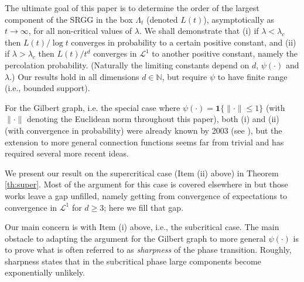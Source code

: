 \documentclass[a4paper,12pt]{scrartcl}
\newcommand{\conn}{\psi}
\theoremstyle{definition}
\theoremstyle{remark}
\begin{document}

The ultimate goal of this paper is to determine the %
order of the largest component of the SRGG in the box $\Lambda_t$
(denoted $L(t)$), asymptotically as $t \to \infty$, for all non-critical values of $\lambda$. We shall demonstrate
that (i) if $\lambda < \lambda_c$ then $L(t)/ \log t$ converges in probability
to a certain positive constant, and (ii)
if $\lambda > \lambda_c$ then $L(t)/  t^d$ converges in $\mathcal L^1$
to another  positive constant,  namely the percolation probability.
(Naturally the limiting constants depend on $d$, $\psi(\cdot)$ and $\lambda$.)
Our results hold in all dimensions
$d \in \mathbb N$, but require $\psi$ to have finite range (i.e., bounded support).

For the Gilbert graph, i.e. the special case
where $\conn(\cdot) = \mathbf{1}\{\|\cdot\| \leq 1\}$
(with $\|\cdot\|$ denoting the Euclidean norm throughout this paper),
both (i) and (ii) (with convergence in probability) were already known by 2003
(see \cite{penrose2003random}), but the extension to more general connection
functions seems far from trivial and has required several more recent ideas.

We present our result on the supercritical case (Item (ii) above) in
Theorem \ref{th:super}.
Most of the argument for this case is covered elsewhere in \cite{pen_giant_comp_srgg,kupper2025,penrose2025supercritical} but those works  leave a gap unfilled, namely getting from convergence of expectations to convergence in $\mathcal L^1$ for $d \geq 3$;
here we fill that gap.

Our main concern is with Item (i) above, i.e., the subcritical case. The
main obstacle to adapting the argument for the Gilbert graph to
more general $\psi(\cdot)$ is to prove
what is often referred to as {\em sharpness} of the phase transition.
Roughly, sharpness states that in the subcritical phase large components become exponentially unlikely.
\end{document}
